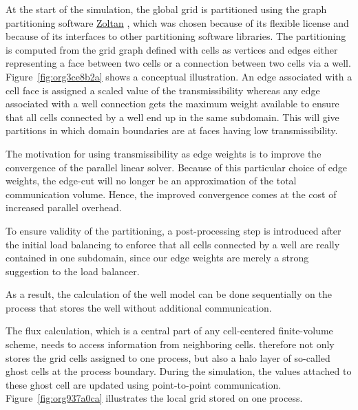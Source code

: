 At the start of the simulation, the global grid is partitioned 
using the graph partitioning software \href{http://www.cs.sandia.gov/Zoltan}{Zoltan} 
\citep{zoltan,ZoltanHypergraphIPDPS06}, {\revised which was chosen because of
its flexible license and because of its interfaces to other partitioning software libraries. 
The partitioning is computed from the grid graph defined}
with cells as vertices and edges
either representing a face between two cells or a connection
between two cells via a well. Figure~\ref{fig:org3ce8b2a} shows a conceptual illustration.
An edge associated with a cell face is assigned {\revised a scaled value of the transmissibility}
whereas any edge associated with a
well connection gets the maximum weight available
to ensure that all cells connected by a well end up in the same subdomain.
This will give partitions in which domain boundaries are at faces having low transmissibility.
{\revised 
The motivation for using transmissibility as edge weights is to improve
the convergence of the parallel linear solver. Because of this particular choice
of edge weights, the edge-cut will no longer be an approximation of the total
communication volume. Hence, the improved convergence comes at the
cost of increased parallel overhead.

To ensure validity of the partitioning, a post-processing step is
introduced after the initial load balancing to enforce that all cells connected 
by a well are really contained in one subdomain, since our edge weights 
are merely a strong suggestion to the load balancer.} %
As a result, the calculation of 
the well model can be done sequentially on the process that stores
the well without additional communication. 


The flux calculation, which is a central part of any 
cell-centered finite-volume scheme, needs to access information from 
neighboring cells. 
\opmflow therefore not only stores the grid cells assigned to one process, but
also a halo layer of so-called ghost cells at the process boundary.
During the simulation, the values attached to these ghost cell are updated
using point-to-point communication. Figure~\ref{fig:org937a0ca} illustrates the
local grid stored on one process. 

